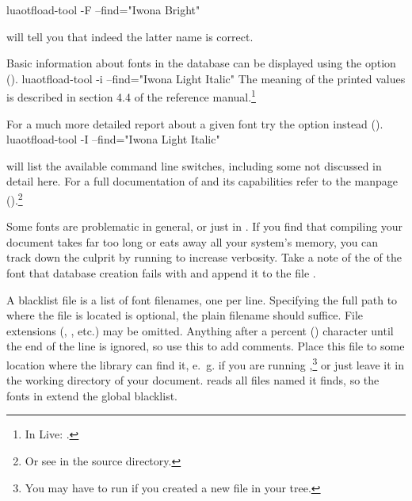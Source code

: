 \beginlisting
  luaotfload-tool  -F --find="Iwona Bright"
\endlisting

\noindent
will tell you that indeed the latter name is correct.

Basic information about fonts in the database can be displayed
using the  option ().
%
\beginlisting
  luaotfload-tool  -i --find="Iwona Light Italic"
\endlisting
%
\noindent
The meaning of the printed values is described in section 4.4 of the
\LUATEX reference manual.\footnote{%
  In \TEX Live: .
}

For a much more detailed report about a given font try the
 option instead ().
\beginlisting
  luaotfload-tool  -I --find="Iwona Light Italic"
\endlisting

 will list the available command line
switches, including some not discussed in detail here.
%
For a full documentation of  and its
capabilities refer to the manpage
().\footnote{%
  Or see  in the source directory.
}

\endsubsection

\label{font-blacklist}

Some fonts are problematic in general, or just in \LUATEX.
%
If you find that compiling your document takes far too long or eats
away all your system’s memory, you can track down the culprit by
running  to increase verbosity.
%
Take a note of the  of the font that database
creation fails with and append it to the file
.

A blacklist file is a list of font filenames, one per line.
Specifying the full path to where the file is located is optional, the
plain filename should suffice.
%
File extensions (, , etc.) may be omitted.
%
Anything after a percent (\inlinecode {\%}) character until the end of the line
is ignored, so use this to add comments.
%
Place this file to some location where the 
library can find it, e.~g.
 if you are running
,\footnote{%
  You may have to run  if you created a new file in
  your  tree.
}
or just leave it in the working directory of your document.
%
 reads all files named
 it finds, so the fonts in
 extend the global blacklist.

